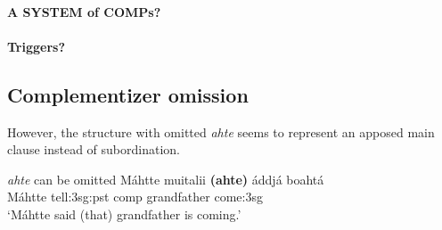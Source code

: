 \documentclass[a4,12pt]{scrartcl}
\begin{document}
\paragraph{A SYSTEM of COMPs?}

\paragraph{Triggers?}


\subsection{Complementizer omission}
However, the structure with omitted {\it ahte} seems to represent an apposed main clause instead of subordination.

\begin{exe}
	\ex \label{ahteOmitted} {\it ahte} can be omitted \cite[439]{nickel1994}%
	\gll 	Máhtte 	muitalii 	{\bf (ahte)} 	áddjá 	boahtá \\
 	Máhtte 	tell:{\sc 3sg:pst} {\sc comp} grandfather come:{\sc 3sg}\\
	\glt ‘Máhtte said (that) grandfather is coming.’
 \end{exe}

%
\end{document}
